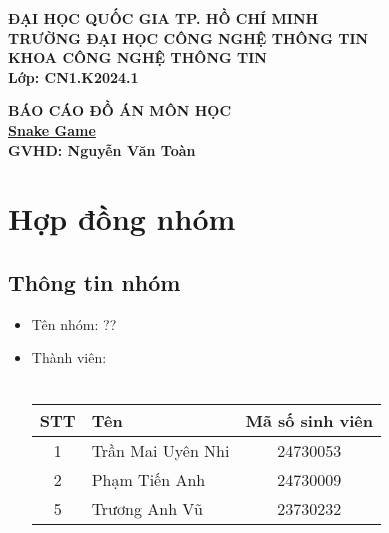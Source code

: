 \documentclass[a4paper, 12pt]{article}
\title{}
\author{}
\date{}
\begin{document}
\maketitle

\begin{center}
    \large \textbf{ĐẠI HỌC QUỐC GIA TP. HỒ CHÍ MINH}\\
    \large \textbf{TRƯỜNG ĐẠI HỌC CÔNG NGHỆ THÔNG TIN}\\
    \large \textbf{KHOA CÔNG NGHỆ THÔNG TIN}\\[2cm]
    
    \textbf{Lớp: CN1.K2024.1}\\
    \vspace{0.5cm}
    
    \vspace{2cm}
    \Large \textbf{BÁO CÁO ĐỒ ÁN MÔN HỌC}\\[0.5cm]
    \Large \textbf{\underline{Snake Game}}\\[0.5cm]
    \Large \textbf{GVHD: Nguyễn Văn Toàn}\\[0.5cm]
    \vspace{2cm}

    \vspace{1cm}
\end{center}

\newpage
\tableofcontents
\newpage

\section{Hợp đồng nhóm}
\subsection{Thông tin nhóm}
\begin{itemize}
    \item Tên nhóm: ??
    \item Thành viên:\\\\
        \begin{tabular}{|c|l|c|}
            \hline
            \textbf{STT} & \textbf{Tên} & \textbf{Mã số sinh viên} \\
            \hline
            1 & Trần Mai Uyên Nhi & 24730053 \\
            \hline
            2 & Phạm Tiến Anh & 24730009 \\
            \hline
            5 & Trương Anh Vũ & 23730232 \\
        \end{tabular}
\end{itemize}
\end{document}
